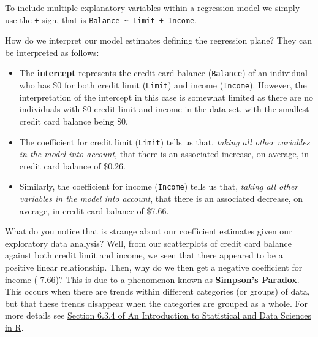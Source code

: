 \documentclass[
  letterpaper,
  DIV=11,
  numbers=noendperiod]{scrartcl}
\providecommand{\tightlist}{%
  \setlength{\itemsep}{0pt}\setlength{\parskip}{0pt}}\usepackage{longtable,booktabs,array}
\begin{document}
\begin{tcolorbox}[enhanced jigsaw, colbacktitle=quarto-callout-note-color!10!white, colback=white, breakable, bottomtitle=1mm, opacityback=0, coltitle=black, title=\textcolor{quarto-callout-note-color}{\faInfo}\hspace{0.5em}{Note}, titlerule=0mm, colframe=quarto-callout-note-color-frame, leftrule=.75mm, toprule=.15mm, toptitle=1mm, arc=.35mm, bottomrule=.15mm, rightrule=.15mm, left=2mm, opacitybacktitle=0.6]

To include multiple explanatory variables within a regression model we
simply use the \texttt{+} sign, that is
\texttt{Balance\ \textasciitilde{}\ Limit\ +\ Income}.

\end{tcolorbox}

How do we interpret our model estimates defining the regression plane?
They can be interpreted as follows:

\begin{itemize}
\tightlist
\item
  The \textbf{intercept} represents the credit card balance
  (\texttt{Balance}) of an individual who has \$0 for both credit limit
  (\texttt{Limit}) and income (\texttt{Income}). However, the
  interpretation of the intercept in this case is somewhat limited as
  there are no individuals with \$0 credit limit and income in the data
  set, with the smallest credit card balance being \$0.
\item
  The coefficient for credit limit (\texttt{Limit}) tells us that,
  \emph{taking all other variables in the model into account}, that
  there is an associated increase, on average, in credit card balance of
  \$0.26.
\item
  Similarly, the coefficient for income (\texttt{Income}) tells us that,
  \emph{taking all other variables in the model into account}, that
  there is an associated decrease, on average, in credit card balance of
  \$7.66.
\end{itemize}

What do you notice that is strange about our coefficient estimates given
our exploratory data analysis? Well, from our scatterplots of credit
card balance against both credit limit and income, we seen that there
appeared to be a positive linear relationship. Then, why do we then get
a negative coefficient for income (-7.66)? This is due to a phenomenon
known as \textbf{Simpson's Paradox}. This occurs when there are trends
within different categories (or groups) of data, but that these trends
disappear when the categories are grouped as a whole. For more details
see
\href{https://moderndive.com/6-multiple-regression.html\#simpsonsparadox}{Section
6.3.4 of An Introduction to Statistical and Data Sciences in R}.
\end{document}
